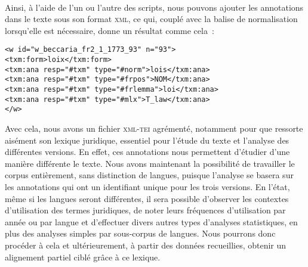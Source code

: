\paragraph{}Ainsi, à l'aide de l'un ou l'autre des scripts, nous pouvons ajouter les annotations dans le texte sous son format \textsc{xml}, ce qui, couplé avec la balise de normalisation lorsqu'elle est nécessaire, donne un résultat comme cela~:
\begin{verbatim}
<w id="w_beccaria_fr2_1_1773_93" n="93">
<txm:form>loix</txm:form>
<txm:ana resp="#txm" type="#norm">lois</txm:ana>
<txm:ana resp="#txm" type="#frpos">NOM</txm:ana>
<txm:ana resp="#txm" type="#frlemma">loi</txm:ana>
<txm:ana resp="#txm" type="#mlx">T_law</txm:ana>
</w>
\end{verbatim}
Avec cela, nous avons un fichier \textsc{xml-tei} agrémenté, notamment pour que ressorte aisément son lexique juridique, essentiel pour l'étude du texte et l'analyse des différentes versions. En effet, ces annotations nous permettent d'étudier d'une manière différente le texte. Nous avons maintenant la possibilité de travailler le corpus entièrement, sans distinction de langues, puisque l'analyse se basera sur les annotations qui ont un identifiant unique pour les trois versions. En l'état, même si les langues seront différentes, il sera possible d'observer les contextes d'utilisation des termes juridiques, de noter leurs fréquences d'utilisation par année ou par langue et d'effectuer divers autres types d'analyses statistiques, en plus des analyses simples par sous-corpus de langues. Nous pourrons donc procéder à cela et ultérieurement, à partir des données recueillies, obtenir un alignement partiel ciblé grâce à ce lexique.